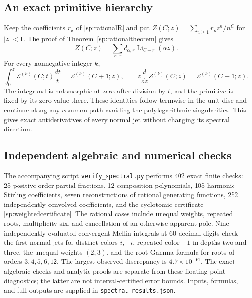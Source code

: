 \subsection{An exact primitive hierarchy}

Keep the coefficients $r_n$ of \eqref{sp:rationalR} and put
$Z(C;z)=\sum_{n\geq1}r_n z^n/n^C$ for $|z|<1$.
The proof of Theorem~\ref{sp:rationaltheorem} gives
\[
 Z(C;z)=\sum_{\alpha,r}d_{\alpha,r}
                    \operatorname{Li}_{C-r}(\alpha z).
\]
For every nonnegative integer $k$,
\begin{equation}\label{sp:primitive}
 \int_0^z Z^{(k)}(C;t)\frac{dt}{t}=Z^{(k)}(C+1;z),
 \qquad
 z\frac{d}{dz}Z^{(k)}(C;z)=Z^{(k)}(C-1;z).
\end{equation}
The integrand is holomorphic at zero after division by $t$, and the
primitive is fixed by its zero value there.  These identities follow
termwise in the unit disc and continue along any common path avoiding
the polylogarithmic singularities.  This gives exact antiderivatives
of every normal jet without changing its spectral direction.

\subsection{Independent algebraic and numerical checks}

The accompanying script \texttt{verify\_spectral.py} performs 402
exact finite checks: 25 positive-order partial fractions, 12
composition polynomials, 105 harmonic--Stirling coefficients, seven
reconstructions of rational generating functions, 252 independently
convolved coefficients, and the cyclotomic certificate
\eqref{sp:weightedcertificate}.  The rational cases include unequal
weights, repeated roots, multiplicity six, and cancellation of an
otherwise apparent pole.  Nine independently evaluated convergent
Mellin integrals at 60 decimal digits check the first normal jets for
distinct colors $i,-i$, repeated color $-1$ in depths two and three,
the unequal weights $(2,3)$, and the root-Gamma formula for roots of
orders $3,4,5,6,12$.  The largest observed discrepancy is
$4.7\times10^{-61}$.  The exact algebraic checks and analytic proofs
are separate from these floating-point diagnostics; the latter are
not interval-certified error bounds.  Inputs, formulas, and full
outputs are supplied in \texttt{spectral\_results.json}.
